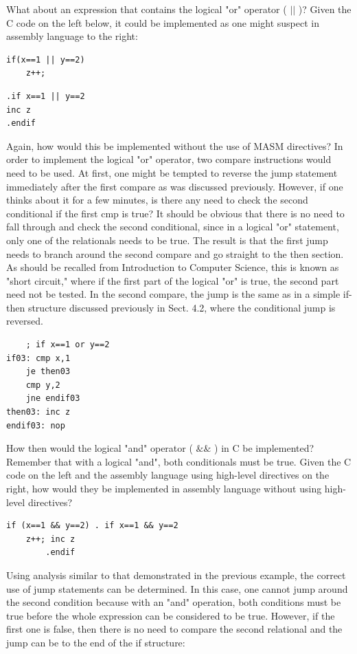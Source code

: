 \documentclass[10pt]{article}
\begin{document}
What about an expression that contains the logical "or" operator ( $|\mid$ )? Given the C code on the left below, it could be implemented as one might suspect in assembly language to the right:

\begin{verbatim}
if(x==1 || y==2)
    z++;
\end{verbatim}

\begin{verbatim}
.if x==1 || y==2
inc z
.endif
\end{verbatim}

Again, how would this be implemented without the use of MASM directives? In order to implement the logical "or" operator, two compare instructions would need to be used. At first, one might be tempted to reverse the jump statement immediately after the first compare as was discussed previously. However, if one thinks about it for a few minutes, is there any need to check the second conditional if the first cmp is true? It should be obvious that there is no need to fall through and check the second conditional, since in a logical "or" statement, only one of the relationals needs to be true. The result is that the first jump needs to branch around the second compare and go straight to the then section. As should be recalled from Introduction to Computer Science, this is known as "short circuit," where if the first part of the logical "or" is true, the second part need not be tested. In the second compare, the jump is the same as in a simple if-then structure discussed previously in Sect. 4.2, where the conditional jump is reversed.

\begin{verbatim}
    ; if x==1 or y==2
if03: cmp x,1
    je then03
    cmp y,2
    jne endif03
then03: inc z
endif03: nop
\end{verbatim}

How then would the logical "and" operator ( $\& \&$ ) in C be implemented? Remember that with a logical "and", both conditionals must be true. Given the C code on the left and the assembly language using high-level directives on the right, how would they be implemented in assembly language without using high-level directives?

\begin{verbatim}
if (x==1 && y==2) . if x==1 && y==2
    z++; inc z
        .endif
\end{verbatim}

Using analysis similar to that demonstrated in the previous example, the correct use of jump statements can be determined. In this case, one cannot jump around the second condition because with an "and" operation, both conditions must be true before the whole expression can be considered to be true. However, if the first one is false, then there is no need to compare the second relational and the jump can be to the end of the if structure:
\end{document}
